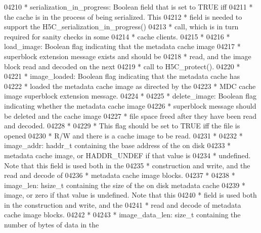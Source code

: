\begin{DoxyCode}
04210 \textcolor{comment}{ * serialization\_in\_progress:  Boolean field that is set to TRUE iff}
04211 \textcolor{comment}{ *      the cache is in the process of being serialized.  This }
04212 \textcolor{comment}{ *      field is needed to support the H5C\_serialization\_in\_progress()}
04213 \textcolor{comment}{ *      call, which is in turn required for sanity checks in some}
04214 \textcolor{comment}{ *      cache clients.}
04215 \textcolor{comment}{ *}
04216 \textcolor{comment}{ * load\_image:  Boolean flag indicating that the metadata cache image }
04217 \textcolor{comment}{ *      superblock extension message exists and should be }
04218 \textcolor{comment}{ *      read, and the image block read and decoded on the next}
04219 \textcolor{comment}{ *      call to H5C\_protect().  }
04220 \textcolor{comment}{ *}
04221 \textcolor{comment}{ * image\_loaded:  Boolean flag indicating that the metadata cache has }
04222 \textcolor{comment}{ *              loaded the metadata cache image as directed by the }
04223 \textcolor{comment}{ *              MDC cache image superblock extension message.}
04224 \textcolor{comment}{ *}
04225 \textcolor{comment}{ * delete\_image: Boolean flag indicating whether the metadata cache image}
04226 \textcolor{comment}{ *      superblock message should be deleted and the cache image}
04227 \textcolor{comment}{ *      file space freed after they have been read and decoded.}
04228 \textcolor{comment}{ *}
04229 \textcolor{comment}{ *      This flag should be set to TRUE iff the file is opened }
04230 \textcolor{comment}{ *      R/W and there is a cache image to be read.}
04231 \textcolor{comment}{ *}
04232 \textcolor{comment}{ * image\_addr:  haddr\_t containing the base address of the on disk }
04233 \textcolor{comment}{ *      metadata cache image, or HADDR\_UNDEF if that value is }
04234 \textcolor{comment}{ *      undefined.  Note that this field is used both in the }
04235 \textcolor{comment}{ *      construction and write, and the read and decode of }
04236 \textcolor{comment}{ *      metadata cache image blocks.}
04237 \textcolor{comment}{ *}
04238 \textcolor{comment}{ * image\_len:   hsize\_t containing the size of the on disk metadata cache }
04239 \textcolor{comment}{ *      image, or zero if that value is undefined.  Note that this }
04240 \textcolor{comment}{ *      field is used both in the construction and write, and the }
04241 \textcolor{comment}{ *      read and decode of metadata cache image blocks.}
04242 \textcolor{comment}{ *}
04243 \textcolor{comment}{ * image\_data\_len:  size\_t containing the number of bytes of data in the }

\end{DoxyCode}
